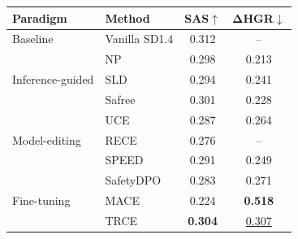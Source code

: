 \begin{tabular}{ll c c}
\toprule
\textbf{Paradigm} & \textbf{Method}
& \textbf{SAS}$\uparrow$
& $\boldsymbol{\Delta}$\textbf{HGR}$\downarrow$ \\
\midrule
Baseline
& Vanilla SD1.4
& 0.312 & -- \\
\midrule
\multirow{3}{*}{Inference-guided}
& NP
& 0.298 & 0.213 \\
& SLD~\cite{schramowski2023safe}
& 0.294 & 0.241 \\
& Safree~\cite{yoon2024safree}
& 0.301 & 0.228 \\
\midrule
\multirow{3}{*}{Model-editing}
& UCE~\cite{gandikota2024unified}
& 0.287 & 0.264 \\
& RECE~\cite{gong2024rece}
& 0.276 & -- \\
& SPEED~\cite{li2026speed}
& 0.291 & 0.249 \\
\midrule
\multirow{3}{*}{Fine-tuning}
& SafetyDPO~\cite{liu2024safetydpo}
& 0.283 & 0.271 \\
& MACE~\cite{lu2024mace}
& 0.224 & \textbf{0.518} \\
& TRCE~\cite{chen2025trce}
& \textbf{0.304} & \underline{0.307} \\
\bottomrule
\end{tabular}